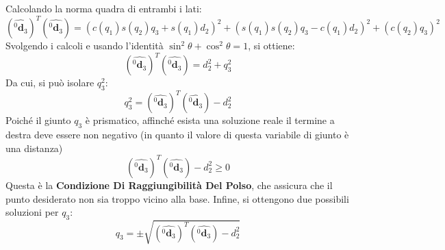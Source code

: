 ﻿\documentclass[11pt, a4paper]{article}
\begin{document}
Calcolando la norma quadra di entrambi i lati:
\[
    (\hat{^{0}\mathbf{d}_{3}})^{T} (\hat{^{0}\mathbf{d}_{3}}) =
    (c(q_{1})s(q_{2})q_{3} + s(q_{1})d_{2})^2 + (s(q_{1})s(q_{2})q_{3} - c(q_{1})d_{2})^2 + (c(q_{2})q_{3})^2
\]
Svolgendo i calcoli e usando l'identità \(\sin^2\theta + \cos^2\theta = 1\), si ottiene:
\[
    (\hat{^{0}\mathbf{d}_{3}})^{T} (\hat{^{0}\mathbf{d}_{3}}) = d_{2}^{2} + q_{3}^{2}
\]
Da cui, si può isolare \(q_{3}^{2}\):
\[
    q_{3}^{2} = (\hat{^{0}\mathbf{d}_{3}})^{T} (\hat{^{0}\mathbf{d}_{3}}) - d_{2}^{2}
\]
Poiché il giunto \(q_3\) è prismatico, affinché esista una soluzione reale il termine a destra deve essere non negativo (in quanto il valore di questa variabile di giunto è una distanza)
\[
    (\hat{^{0}\mathbf{d}_{3}})^{T} (\hat{^{0}\mathbf{d}_{3}}) - d_{2}^{2} \geq 0
\]
Questa è la \textbf{Condizione Di Raggiungibilità Del Polso}, che assicura che il punto desiderato non sia troppo vicino alla base. Infine, si ottengono due possibili soluzioni per \( q_{3} \):
\[
    \boxed{
        q_{3} = \pm \sqrt{(\hat{^{0}\mathbf{d}_{3}})^{T} (\hat{^{0}\mathbf{d}_{3}}) - d_{2}^{2}}
    }
\]
\newpage
\end{document}
